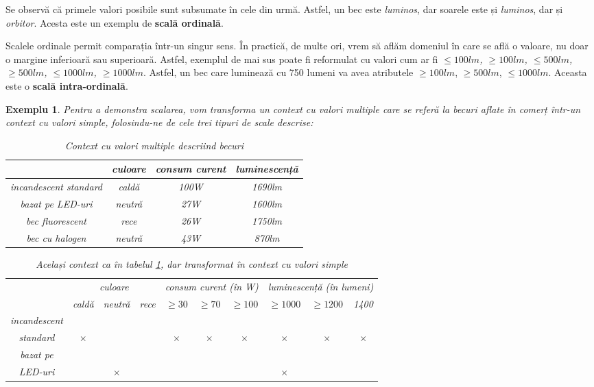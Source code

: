\documentclass[12pt, a4paper, twoside, romanian]{teza-upb}
\newtheorem{example}{Exemplu}
\begin{document}
    Se observă că primele valori posibile sunt subsumate în cele din urmă. Astfel, un bec este \textit{luminos}, dar soarele este și \textit{luminos}, dar și \textit{orbitor}. Acesta este un exemplu de \textbf{scală ordinală}.

  Scalele ordinale permit comparația într-un singur sens. În practică, de multe ori, vrem să aflăm domeniul în care se află o valoare, nu doar o margine inferioară sau superioară. Astfel, exemplul de mai sus poate fi reformulat cu valori cum ar fi \textit{{$\le 100lm$, $\ge 100lm$, $\le 500 lm$, $\ge 500 lm$, $\le 1000 lm$, $\ge 1000 lm$}}. Astfel, un bec care luminează cu 750 lumeni va avea atributele {$\ge 100 lm$, $\ge 500 lm$, $\le 1000 lm$}. Aceasta este o \textbf{scală intra-ordinală}.


  \begin{example}
  Pentru a demonstra scalarea, vom transforma un context cu valori multiple care se referă la becuri aflate în comerț într-un context cu valori simple, folosindu-ne de cele trei tipuri de scale descrise:
    \begin{table}[h!]
      \begin{tabular}[c]{| c | c | c | c |}\hline
        & culoare & consum curent & luminescență \\ \hline 
          incandescent standard & caldă & 100W & 1690lm \\ \hline
          bazat pe LED-uri & neutră & 27W & 1600lm \\ \hline
          bec fluorescent & rece & 26W & 1750lm \\ \hline
          bec cu halogen & neutră & 43W & 870lm \\ \hline
      \end{tabular}
      \caption{Context cu valori multiple descriind becuri}
      \label{table:becuri-multiple}
    \end{table}
  \begin{table}[h!]
    \begin{tabular}[c]{| c | c | c | c | c | c | c | c | c | c}\hline
      & \multicolumn{3}{|c|}{culoare} &
        \multicolumn{3}{|c|}{consum curent (în W)} & 
        \multicolumn{3}{|c|}{luminescență (în lumeni)} \\
      & caldă & neutră & rece & $\ge 30$ & $\ge 70$ & $\ge 100$ &
      $\ge 1000$ & $\ge 1200$ & 1400\\ \hline
      incandescent\\
      standard & $\times$ & & & $\times$ & $\times$ & $\times$ &
      $\times$ & $\times$ & $\times$ \\ \hline
      bazat pe\\
      LED-uri & & $\times$ & & & & & $\times$&&
    \end{tabular}
    \caption{Același context ca în tabelul \ref{table:becuri-multiple}, dar transformat în context cu valori simple}
  \end{table}
  \end{example}
\end{document}

